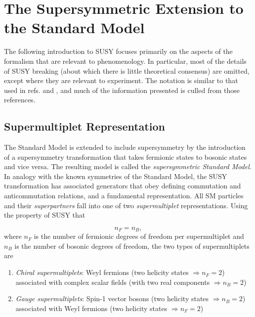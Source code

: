 \documentclass[dissertation.tex]{subfiles}
\begin{document}
\chapter{The Supersymmetric Extension to the Standard Model}
\label{chap:The Supersymmetric Extension to the Standard Model}

The following introduction to SUSY focuses primarily on the aspects of the formalism that are relevant to phenomenology.  In particular, most of the details of SUSY breaking (about which there is little theoretical consensus) are omitted, except where they are relevant to experiment.  The notation is similar to that used in refs. \cite{Aitchison:1111394} and \cite{SUSY_primer}, and much of the information presented is culled from those references.

\section{Supermultiplet Representation}
\label{sec:Supermultiplet Representation}

The Standard Model is extended to include supersymmetry by the introduction of a supersymmetry transformation that takes fermionic states to bosonic states and vice versa.  The resulting model is called the \textit{supersymmetric Standard Model}.  In analogy with the known symmetries of the Standard Model, the SUSY transformation has associated generators that obey defining commutation and anticommutation relations, and a fundamental representation.  All SM particles and their \textit{superpartners} fall into one of two \textit{supermultiplet} representations.  Using the property of SUSY that

\begin{equation}
n_{F} = n_{B},
\end{equation}
%
where $n_{F}$ is the number of fermionic degrees of freedom per supermultiplet and $n_{B}$ is the number of bosonic degrees of freedom, the two types of supermultiplets are

\begin{enumerate}
  \item \textit{Chiral supermultiplets}: Weyl fermions (two helicity states $\Rightarrow n_{F} = 2$) associated with complex scalar fields (with two real components $\Rightarrow n_{B} = 2$)
  \item \textit{Gauge supermultiplets}: Spin-1 vector bosons (two helicity states $\Rightarrow n_{B} = 2$) associated with Weyl fermions (two helicity states $\Rightarrow n_{F} = 2$)
\end{enumerate}
\end{document}

